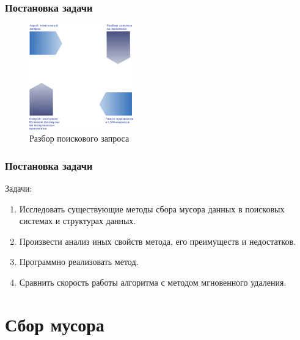 \documentclass[aspectratio=169, pdf, 8pt, unicode]{beamer}
\begin{document}
\begin{frame}[fragile]
\frametitle{Постановка задачи}
\begin{figure}[H]
\centering
\includegraphics[width=0.4\textwidth]{fig/parser.png}
\caption{Разбор поискового запроса}
\end{figure}
\end{frame}

\begin{frame}[fragile]
    \frametitle{Постановка задачи}
    {\large Задачи:}
    \vspace{5mm}
    \begin{enumerate}
    \item Исследовать существующие методы сбора мусора данных в поисковых системах и структурах данных.
    \vspace{5mm}
    \item Произвести анализ иных свойств метода, его преимуществ и недостатков.
    \vspace{5mm}
    \item Программно реализовать метод.
    \vspace{5mm}
    \item Сравнить скорость работы алгоритма с методом мгновенного удаления.
    \end{enumerate}
    \end{frame}

\section{Сбор мусора}
\end{document}
